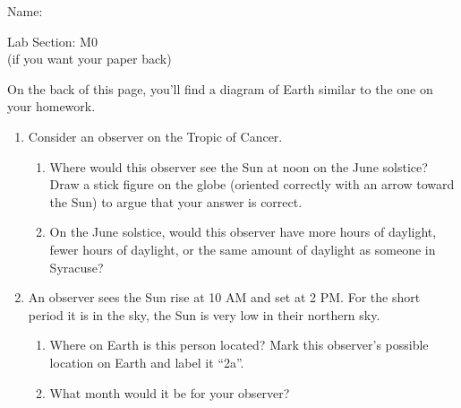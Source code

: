 \documentclass[12pt]{article}
\begin{document}
	\Large
\centerline{}

\begin{minipage}{0.6\textwidth}
	\Large
	Name: \underline{\hspace{3in}}
\end{minipage}
\begin{minipage}{0.4\textwidth}
	\Large
	Lab Section: M0\underline{\hspace{1in}}\\
	\small (if you want your paper back)
\end{minipage}

\normalsize

	On the back of this page, you'll find a diagram of Earth similar to the one on your homework.  


\begin{enumerate}	
	\item Consider an observer on the Tropic of Cancer.
	
	\begin{enumerate}
		\item Where would this observer see the Sun at noon on the June solstice? Draw a stick figure on the globe (oriented correctly with an arrow toward the Sun) to argue that your answer is correct.
		
		\vspace{1in}
		
		\item On the June solstice, would this observer have more hours of daylight, fewer hours of daylight, or the same amount of daylight as someone in Syracuse? 
		
		\vspace{1.5in}
		
	\end{enumerate} 
	
	\item An observer sees the Sun rise at 10 AM and set at 2 PM. For the short period it is in the sky, the Sun is very low in their northern sky.
	
	\vspace{1.5in}
	
	
	\begin{enumerate}
		\item Where on Earth is this person located? Mark this observer's possible location on Earth and label it ``2a''.
		
		\item What month would it be for your observer?
		
		\vspace{1.5in}
		
	\end{enumerate}
	
	
	
\end{enumerate}
\end{document}
